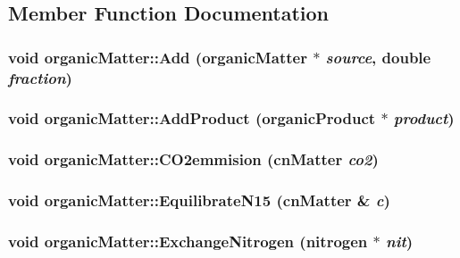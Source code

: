 \subsection{Member Function Documentation}
\hypertarget{classorganic_matter_af8e7ce68e31c09319d0b33d7f20a5100}{
\subsubsection[{Add}]{\setlength{\rightskip}{0pt plus 5cm}void organicMatter::Add ({\bf organicMatter} $\ast$ {\em source}, \/  double {\em fraction})}}
\label{classorganic_matter_af8e7ce68e31c09319d0b33d7f20a5100}
\hypertarget{classorganic_matter_affa8ea4461d2badd187dc2fe9ef467d7}{
\subsubsection[{AddProduct}]{\setlength{\rightskip}{0pt plus 5cm}void organicMatter::AddProduct ({\bf organicProduct} $\ast$ {\em product})}}
\label{classorganic_matter_affa8ea4461d2badd187dc2fe9ef467d7}
\hypertarget{classorganic_matter_af8da4028cf9d47ffff40198537947652}{
\subsubsection[{CO2emmision}]{\setlength{\rightskip}{0pt plus 5cm}void organicMatter::CO2emmision ({\bf cnMatter} {\em co2})}}
\label{classorganic_matter_af8da4028cf9d47ffff40198537947652}
\hypertarget{classorganic_matter_a72ff536fcbc069deadb4f136080becbb}{
\subsubsection[{EquilibrateN15}]{\setlength{\rightskip}{0pt plus 5cm}void organicMatter::EquilibrateN15 ({\bf cnMatter} \& {\em c})}}
\label{classorganic_matter_a72ff536fcbc069deadb4f136080becbb}
\hypertarget{classorganic_matter_a43dda8881019ddfe13875940264505cb}{
\subsubsection[{ExchangeNitrogen}]{\setlength{\rightskip}{0pt plus 5cm}void organicMatter::ExchangeNitrogen ({\bf nitrogen} $\ast$ {\em nit})}}
